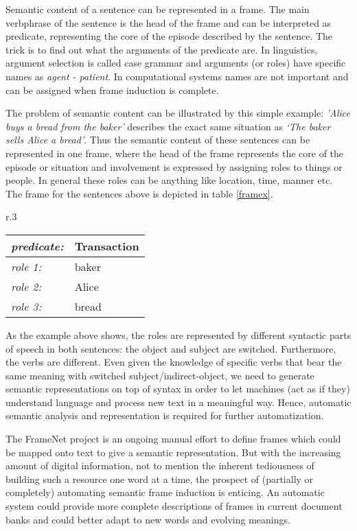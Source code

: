 \documentclass{article} %
\begin{document}
Semantic content of a sentence can be represented in a frame. The main verbphrase of the sentence is the head of the frame and can be interpreted as predicate, representing the core of the episode described by the sentence. The trick is to find out what the arguments of the predicate are. In linguistics, argument selection is called case grammar \citep{dowty1991} and arguments (or roles) have specific names as \textit{agent - patient}. In computational systems names are not important and can be assigned when frame induction is complete.

The problem of semantic content can be illustrated by this simple example: \textit{'Alice buys a bread from the baker'} describes the exact same situation as \textit{`The baker sells Alice a bread'}. Thus the semantic content of these sentences can be represented in one frame, where the head of the frame represents the core of the episode or situation and involvement is expressed by assigning roles to things or people. In general these roles can be anything like location, time, manner etc. The frame for the sentences above is depicted in table \ref{framex}.
\begin{wraptable}{r}{.3\textwidth}
  \centering
\begin{tabular}{|l l|}
  \hline
  \textit{\small predicate:\normalsize}&Transaction\\
  \hline
  \hline
  \textit{\small role 1:\normalsize} &baker\\
  \textit{\small role 2:\normalsize} &Alice\\
  \textit{\small role 3:\normalsize} &bread\\
  \hline
\end{tabular}
\caption{Simple frame}
\label{framex}
\end{wraptable}
As the example above shows, the roles are represented by different syntactic parts of speech in both sentences: the object and subject are switched. Furthermore, the verbs are different. Even given the knowledge of specific verbs that bear the same meaning with switched subject/indirect-object, we need to generate semantic representations on top of syntax in order to let machines (act as if they) understand language and process new text in a meaningful way. Hence, automatic semantic analysis and representation is required for further automatization.

The FrameNet project \citep{FrameNet} is an ongoing manual effort to define frames which could be mapped onto text to give a semantic representation. But with the increasing amount of digital information, not to mention the inherent tediousness of building such a resource one word at a time, the prospect of (partially or completely) automating semantic frame induction is enticing. An automatic system could provide more complete descriptions of frames in current document banks and could better adapt to new words and evolving meanings.
\end{document}
